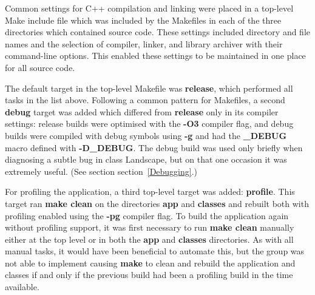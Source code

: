 Common settings for C++ compilation and linking were placed in a top-level Make include file which was included by the Makefiles in each of the three directories which contained source code.  These settings included directory and file names and the selection of compiler, linker, and library archiver with their command-line options.  This enabled these settings to be maintained in one place for all source code.  

The default target in the top-level Makefile was \textbf{release}, which performed all tasks in the list above.  Following a common pattern for Makefiles, a second \textbf{debug} target was added which differed from \textbf{release} only in its compiler settings: release builds were optimised with the \textbf{-O3} compiler flag, and debug builds were compiled with debug symbols using \textbf{-g} and had the \textbf{\_DEBUG} macro defined with \textbf{-D\_DEBUG}.  The debug build was used only briefly when diagnosing a subtle bug in class Landscape, but on that one occasion it was extremely useful.  (See section section~\ref{Debugging}.)

For profiling the application, a third top-level target was added: \textbf{profile}.  This target ran \textbf{make clean} on the directories \textbf{app} and \textbf{classes} and rebuilt both with profiling enabled using the \textbf{-pg} compiler flag.  To build the application again without profiling support, it was first necessary to run \textbf{make clean} manually either at the top level or in both the \textbf{app} and \textbf{classes} directories.  As with all manual tasks, it would have been beneficial to automate this, but the group was not able to implement causing \textbf{make} to clean and rebuild the application and classes if and only if the previous build had been a profiling build in the time available.